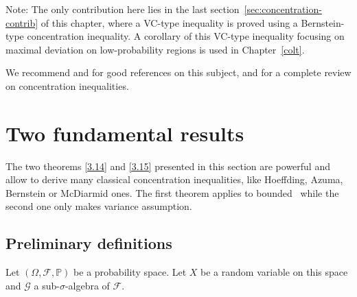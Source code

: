 Note: The only contribution here lies in the last section~\ref{sec:concentration-contrib} of this chapter, where a VC-type inequality is proved using a Bernstein-type concentration inequality. A corollary of this VC-type inequality focusing on maximal deviation on low-probability regions is used in Chapter~\ref{colt}.

We recommend \cite{McDiarmid98} and \cite{Janson2002} for good references on this subject, and \cite{Massart2007, BLM2013} for a complete review on concentration inequalities.



\section{Two fundamental results}
The two theorems \ref{3.14} and \ref{3.15} presented in this section are powerful and allow to derive many classical concentration inequalities, like
Hoeffding, Azuma, Bernstein or McDiarmid ones. The first theorem applies to bounded \rv~while the second one only makes variance assumption.

\subsection{Preliminary definitions}
Let $(\Omega,\mathcal{F},\mathbb{P})$ be a probability space.
Let $X$ be a random variable on this space and $\mathcal{G}$ a sub-$\sigma$-algebra of $\mathcal{F}$.

